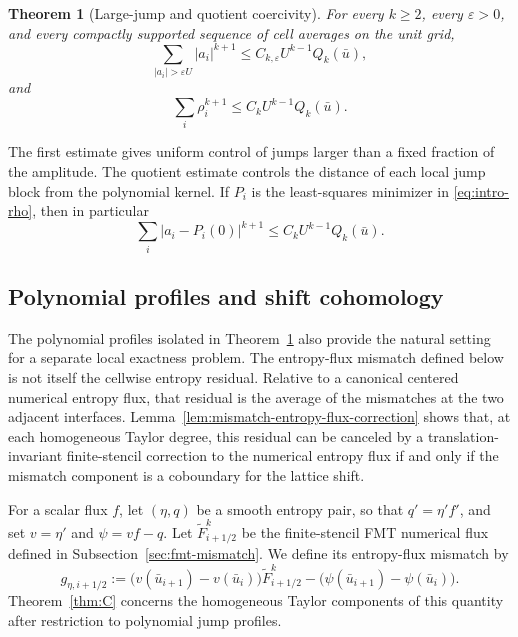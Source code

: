 \documentclass[11pt]{amsart}
\theoremstyle{plain}
\theoremstyle{definition}
\theoremstyle{remark}
\numberwithin{equation}{section}
\theoremstyle{plain}
\newtheorem{lettertheorem}{Theorem}
\begin{document}
\begin{lettertheorem}[Large-jump and quotient coercivity]\label{thm:B}
	For every $k\ge2$, every $\varepsilon>0$, and every compactly supported
	sequence of cell averages on the unit grid,
	\begin{equation}\label{eq:intro-large-jump-main}
		\sum_{|a_i|>\varepsilon U}|a_i|^{k+1}
		\le C_{k,\varepsilon}U^{k-1}Q_k(\bar u),
	\end{equation}
	and
	\begin{equation}\label{eq:intro-quotient-main}
		\sum_i\rho_i^{k+1}
		\le C_k U^{k-1}Q_k(\bar u).
	\end{equation}
\end{lettertheorem}

The first estimate gives uniform control of jumps larger than a fixed fraction
of the amplitude.  The quotient estimate controls the distance of each local
jump block from the polynomial kernel.  If $P_i$ is the least-squares
minimizer in
\eqref{eq:intro-rho}, then in particular
\[
	\sum_i|a_i-P_i(0)|^{k+1}\le C_kU^{k-1}Q_k(\bar u).
\]

\subsection{Polynomial profiles and shift cohomology}
\label{sec:intro-shift-result}



The polynomial profiles isolated in Theorem~\ref{thm:B} also provide the
natural setting for a separate local exactness problem.  The entropy-flux
mismatch defined below is not itself the cellwise entropy residual.  Relative
to a canonical centered numerical entropy flux, that residual is the average
of the mismatches at the two adjacent interfaces.
Lemma~\ref{lem:mismatch-entropy-flux-correction} shows that, at each
homogeneous Taylor degree, this residual can be canceled by a
translation-invariant finite-stencil correction to the numerical entropy flux
if and only if the mismatch component is a coboundary for the lattice shift.


For a scalar flux $f$, let $(\eta,q)$ be a smooth entropy pair, so that
$q'=\eta'f'$, and set $v=\eta'$ and $\psi=vf-q$.  Let
$\widetilde F^k_{i+1/2}$ be the finite-stencil FMT numerical flux defined in
Subsection~\ref{sec:fmt-mismatch}.  We define its entropy-flux mismatch by
\begin{equation}\label{eq:intro-entropy-flux-mismatch}
	g_{\eta,i+1/2}
	:=\bigl(v(\bar u_{i+1})-v(\bar u_i)\bigr)
	  \widetilde F^k_{i+1/2}
	 -\bigl(\psi(\bar u_{i+1})-\psi(\bar u_i)\bigr).
\end{equation}
Theorem~\ref{thm:C} concerns the homogeneous Taylor components of this
quantity after restriction to polynomial jump profiles.
\end{document}
